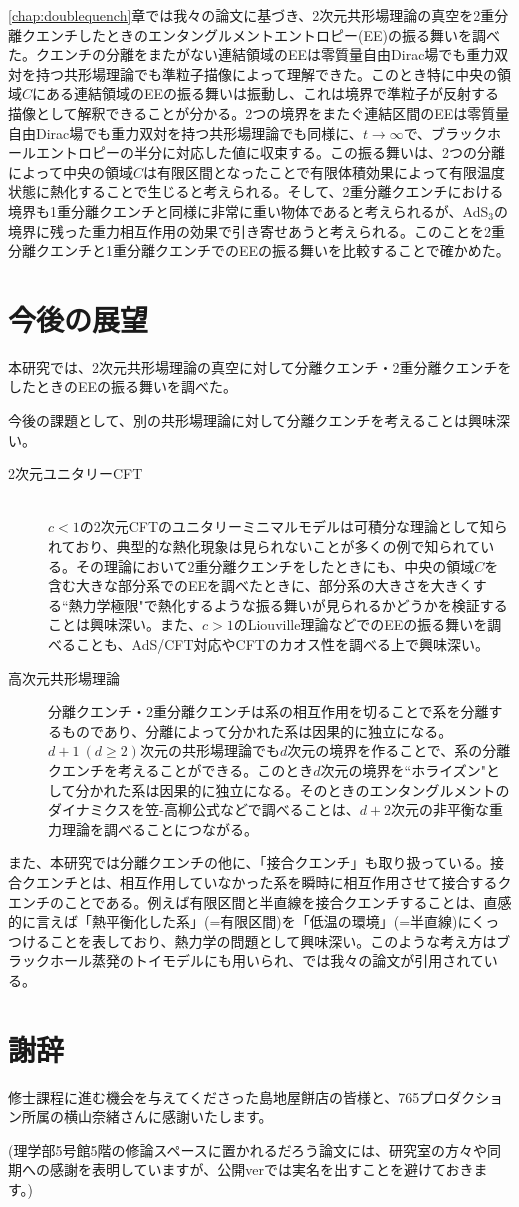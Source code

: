 \ref{chap:doublequench}章では我々の論文\cite{Caputa:2019avh}に基づき、2次元共形場理論の真空を2重分離クエンチしたときのエンタングルメントエントロピー(EE)の振る舞いを調べた。クエンチの分離をまたがない連結領域のEEは零質量自由Dirac場でも重力双対を持つ共形場理論でも準粒子描像によって理解できた。このとき特に中央の領域$C$にある連結領域のEEの振る舞いは振動し、これは境界で準粒子が反射する描像として解釈できることが分かる。2つの境界をまたぐ連結区間のEEは零質量自由Dirac場でも重力双対を持つ共形場理論でも同様に、$t\to \infty$で、ブラックホールエントロピーの半分に対応した値に収束する。この振る舞いは、2つの分離によって中央の領域$C$は有限区間となったことで有限体積効果によって有限温度状態に熱化することで生じると考えられる。そして、2重分離クエンチにおける境界も1重分離クエンチと同様に非常に重い物体であると考えられるが、AdS$_3$の境界に残った重力相互作用の効果で引き寄せあうと考えられる。このことを2重分離クエンチと1重分離クエンチでのEEの振る舞いを比較することで確かめた。
\section*{今後の展望}
本研究では、2次元共形場理論の真空に対して分離クエンチ・2重分離クエンチをしたときのEEの振る舞いを調べた。

今後の課題として、別の共形場理論に対して分離クエンチを考えることは興味深い。
\begin{description}
	\item[2次元ユニタリーCFT] \hfill\\
	$c<1$の2次元CFTのユニタリーミニマルモデルは可積分な理論として知られており、典型的な熱化現象は見られないことが多くの例で知られている。その理論において2重分離クエンチをしたときにも、中央の領域$C$を含む大きな部分系でのEEを調べたときに、部分系の大きさを大きくする``熱力学極限"で熱化するような振る舞いが見られるかどうかを検証することは興味深い。また、$c>1$のLiouville理論などでのEEの振る舞いを調べることも、AdS/CFT対応やCFTのカオス性を調べる上で興味深い。
	\item[高次元共形場理論]
	分離クエンチ・2重分離クエンチは系の相互作用を切ることで系を分離するものであり、分離によって分かれた系は因果的に独立になる。$d+1\ (d\ge 2)$次元の共形場理論でも$d$次元の境界を作ることで、系の分離クエンチを考えることができる。このとき$d$次元の境界を``ホライズン"として分かれた系は因果的に独立になる。そのときのエンタングルメントのダイナミクスを笠-高柳公式などで調べることは、$d+2$次元の非平衡な重力理論を調べることにつながる。
\end{description}

また、本研究\cite{Shimaji:2018czt}\cite{Caputa:2019avh}では分離クエンチの他に、「接合クエンチ」も取り扱っている。接合クエンチとは、相互作用していなかった系を瞬時に相互作用させて接合するクエンチのことである。例えば有限区間と半直線を接合クエンチすること\cite{Calabrese_2016}は、直感的に言えば「熱平衡化した系」(=有限区間)を「低温の環境」(=半直線)にくっつけることを表しており、熱力学の問題として興味深い。このような考え方はブラックホール蒸発のトイモデルにも用いられ、\cite{almheiri2019page}では我々の論文\cite{Shimaji:2018czt}が引用されている。

\section*{謝辞}
修士課程に進む機会を与えてくださった島地屋餅店の皆様と、765プロダクション所属の横山奈緒さんに感謝いたします。

(理学部5号館5階の修論スペースに置かれるだろう論文には、研究室の方々や同期への感謝を表明していますが、公開verでは実名を出すことを避けておきます。)